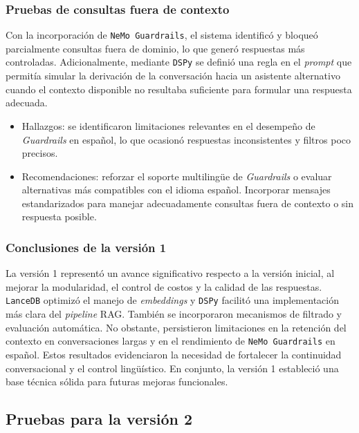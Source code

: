 \subsubsection{Pruebas de consultas fuera de contexto}

Con la incorporación de \texttt{NeMo Guardrails}, el sistema identificó y bloqueó parcialmente consultas fuera de dominio, lo que generó respuestas más controladas. Adicionalmente, mediante \texttt{DSPy} se definió una regla en el \textit{prompt} que permitía simular la derivación de la conversación hacia un asistente alternativo cuando el contexto disponible no resultaba suficiente para formular una respuesta adecuada.

\begin{itemize}
    \item Hallazgos: se identificaron limitaciones relevantes en el desempeño de \textit{Guardrails} en español, lo que ocasionó respuestas inconsistentes y filtros poco precisos.
    \item Recomendaciones: reforzar el soporte multilingüe de \textit{Guardrails} o evaluar alternativas más compatibles con el idioma español. Incorporar mensajes estandarizados para manejar adecuadamente consultas fuera de contexto o sin respuesta posible.
\end{itemize}

\subsubsection{Conclusiones de la versión 1}

La versión 1 representó un avance significativo respecto a la versión inicial, al mejorar la modularidad, el control de costos y la calidad de las respuestas. \texttt{LanceDB} optimizó el manejo de \textit{embeddings} y \texttt{DSPy} facilitó una implementación más clara del \textit{pipeline} RAG. También se incorporaron mecanismos de filtrado y evaluación automática. No obstante, persistieron limitaciones en la retención del contexto en conversaciones largas y en el rendimiento de \texttt{NeMo Guardrails} en español. Estos resultados evidenciaron la necesidad de fortalecer la continuidad conversacional y el control lingüístico. En conjunto, la versión 1 estableció una base técnica sólida para futuras mejoras funcionales.



\subsection{Pruebas para la versión 2}
\label{sec:resultadosPruebasV2}

